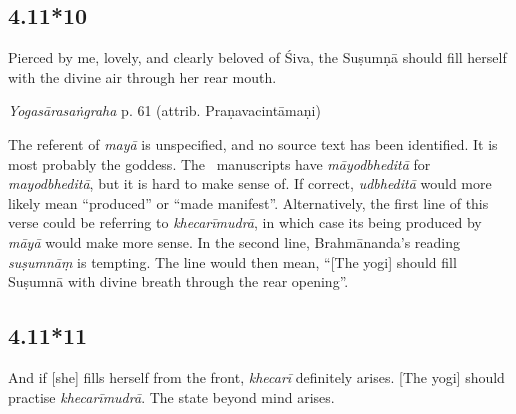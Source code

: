 \begin{ekdosis}
\subsection*{4.11*10}
\begin{translation}[hp04_011_10]
Pierced by me, lovely, and clearly beloved of Śiva, the Suṣumṇā should fill herself with the divine air through her rear mouth.
\end{translation}


\begin{testimonia}[hp04_011_10]
\emph{Yogasārasaṅgraha} p. 61 (attrib. Praṇavacintāmaṇi)
\begin{versinnote}
\end{versinnote}
\end{testimonia}

\begin{philcomm}[hp04_011_10]
The referent of \emph{mayā} is unspecified, and no source text has been identified. It is most probably the goddess. The \textepsilon\ manuscripts have \emph{māyodbheditā} for \emph{mayodbheditā}, but it is hard to make sense of. If correct, \emph{udbheditā} would more likely mean “produced” or “made manifest”. Alternatively, the first line of this verse could be referring to \emph{khecarīmudrā}, in which case its being produced by \emph{māyā} would make more sense. In the second line, Brahmānanda’s reading \emph{suṣumnāṃ} is tempting. The line would then mean, “[The yogi] should fill Suṣumnā with divine breath through the rear opening”.
\end{philcomm}


\subsection*{4.11*11}
\begin{translation}[hp04_011_11]
And if [she] fills herself from the front, \emph{khecarī} definitely arises. [The yogi] should practise \emph{khecarīmudrā}. The state beyond mind arises.
\end{translation}



\end{ekdosis}
